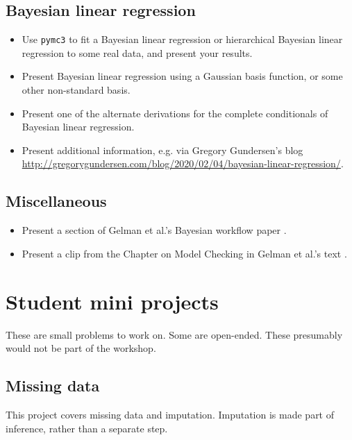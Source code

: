 \documentclass{article} %
\begin{document}
\subsection{Bayesian linear regression} 
\begin{itemize}
\item Use \texttt{pymc3} to fit a Bayesian linear regression or hierarchical Bayesian linear regression to some real data, and present your results.  
\item Present Bayesian linear regression using a Gaussian basis function, or some other non-standard basis.  
\item Present one of the alternate derivations for the complete conditionals of Bayesian linear regression.
\item Present additional information, e.g. via Gregory Gundersen's blog \url{http://gregorygundersen.com/blog/2020/02/04/bayesian-linear-regression/}.
\end{itemize}

\subsection{Miscellaneous} 
\begin{itemize}
\item Present a section of Gelman et al.'s Bayesian workflow paper \cite{gelman2020bayesian}. 
\item Present a clip from the Chapter on Model Checking in Gelman et al.'s text \cite{gelman2013bayesian}.
\end{itemize}



{}




\appendix

\section{Student mini projects}

These are small problems to work on.  Some are open-ended.  These presumably would not be part of the workshop.

\subsection{Missing data}

This project covers missing data and imputation.  Imputation is made part of inference,  rather than a separate step. 
\end{document}
